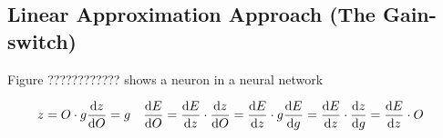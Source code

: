 \subsection{Linear Approximation Approach (The Gain-switch)}

Figure ???????????? shows a neuron in a neural network

\begin{align}
z = O\cdot g
&\dv{z}{O} = g
&\dv{E}{O} = \dv{E}{z}\cdot \dv{z}{O} = \dv{E}{z}\cdot g
&\dv{E}{g} = \dv{E}{z}\cdot \dv{z}{g} = \dv{E}{z}\cdot O
\end{align}